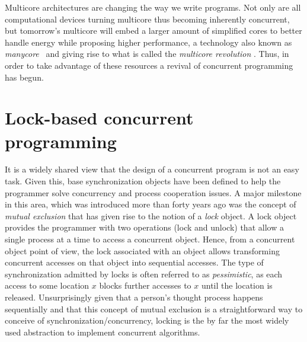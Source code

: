 Multicore architectures are changing the way we write programs.
Not only are all computational devices
turning multicore thus becoming inherently concurrent, 
but tomorrow's multicore will embed a larger amount of simplified cores to better handle energy while 
proposing higher performance, a technology also known as \emph{manycore}~\cite{Borkar2007}
and giving rise to what is called the {\it multicore  
revolution} \cite{HL08}.
Thus, in order to take advantage of these resources a revival of concurrent programming has begun.


\section{Lock-based concurrent programming}\label{sec:intro-lockbased}
%
It is a widely shared view  that the design of a concurrent program is not an easy
task.
Given this, base synchronization objects have been defined to help 
the programmer solve  concurrency and process cooperation  issues. 
A  major milestone in this area, which was introduced 
more than forty years  ago was the concept of {\it mutual exclusion} \cite{D68}
that has given rise  to  the  notion of  a  {\it  lock} object.    
A lock object provides the programmer with two operations (lock and unlock)
that  allow a single process at a time to access a concurrent object. 
Hence, from a  concurrent object point of view,   the  lock associated with
an object allows transforming  concurrent  accesses on  that object  
into sequential accesses.
The type of synchronization admitted by locks is often referred to as \emph{pessimistic}, 
as each access to some location $x$ blocks further accesses to $x$ until the location is released.
Unsurprisingly given that
a person's thought process happens sequentially
and that this concept of mutual exclusion is a straightforward way to
conceive of synchronization/concurrency,
locking is the by far the most widely used abstraction to
implement concurrent algorithms.

